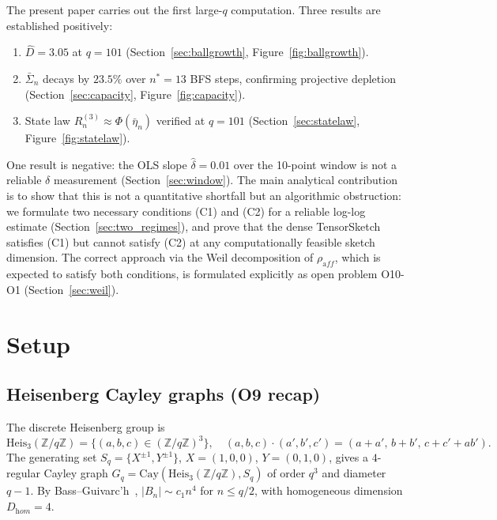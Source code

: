 \documentclass[11pt,a4paper]{article}
\newcommand{\Heis}{\mathrm{Heis}_3(\mathbb{Z}/q\mathbb{Z})}
\newcommand{\Cay}{\mathrm{Cay}}
\newcommand{\Dhat}{\hat{D}}
\newcommand{\delt}{\hat{\delta}}
\begin{document}
    The present paper carries out the first large-$q$ computation.
    Three results are established positively:
    \begin{enumerate}
      \item $\Dhat = 3.05$ at $q = 101$ (Section~\ref{sec:ballgrowth},
      Figure~\ref{fig:ballgrowth}).
      \item $\bar\Sigma_n$ decays by $23.5\%$ over $n^* = 13$ BFS steps,
      confirming projective depletion (Section~\ref{sec:capacity},
      Figure~\ref{fig:capacity}).
      \item State law $R_n^{(3)} \approx \Phi(\bar\eta_n)$ verified at $q = 101$
      (Section~\ref{sec:statelaw}, Figure~\ref{fig:statelaw}).
    \end{enumerate}
    One result is negative: the OLS slope $\delt = 0.01$ over the 10-point
    window is not a reliable $\delta$ measurement (Section~\ref{sec:window}).
    The main analytical contribution is to show that this is not a quantitative
    shortfall but an algorithmic obstruction: we formulate two necessary
    conditions (C1) and (C2) for a reliable log-log estimate
    (Section~\ref{sec:two_regimes}), and prove that the dense TensorSketch
    satisfies (C1) but cannot satisfy (C2) at any computationally feasible
    sketch dimension.
    The correct approach via the Weil decomposition of $\rho_{\mathrm aff}$,
    which is expected to satisfy both conditions, is formulated explicitly
    as open problem O10-O1 (Section~\ref{sec:weil}).

  \section{Setup}

  \subsection{Heisenberg Cayley graphs (O9 recap)}

    The discrete Heisenberg group is
    \[
      \Heis = \bigl\{(a,b,c) \in (\mathbb{Z}/q\mathbb{Z})^3\bigr\},
      \quad
      (a,b,c)\cdot(a',b',c') = (a{+}a',\,b{+}b',\,c{+}c'{+}ab').
    \]
    The generating set $S_q = \{X^{\pm 1}, Y^{\pm 1}\}$,
    $X = (1,0,0)$, $Y = (0,1,0)$, gives a $4$-regular Cayley graph
    $G_q = \Cay(\Heis, S_q)$ of order $q^3$ and diameter $q - 1$.
    By Bass--Guivarc'h~\cite{Bass,Guivarch}, $|B_n| \sim c_1 n^4$ for
    $n \leq q/2$, with homogeneous dimension $D_{\mathrm hom} = 4$.
\end{document}
